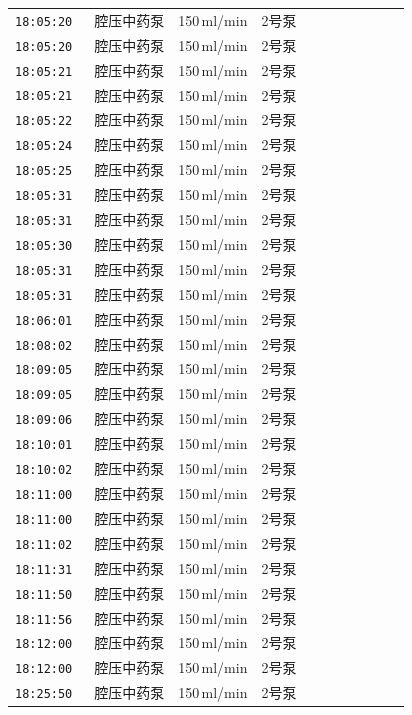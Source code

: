\documentclass[UTF8,10pt,a4paper,fontset=fandol]{ctexart}
\begin{document}
\begin{center}
\begin{tabular}{p{0.18\linewidth}p{0.72\linewidth}}
\texttt{18:05:20} & 腔压中药泵　150\,ml/min　2号泵\\
\texttt{18:05:20} & 腔压中药泵　150\,ml/min　2号泵\\
\texttt{18:05:21} & 腔压中药泵　150\,ml/min　2号泵\\
\texttt{18:05:21} & 腔压中药泵　150\,ml/min　2号泵\\
\texttt{18:05:22} & 腔压中药泵　150\,ml/min　2号泵\\
\texttt{18:05:24} & 腔压中药泵　150\,ml/min　2号泵\\
\texttt{18:05:25} & 腔压中药泵　150\,ml/min　2号泵\\
\texttt{18:05:31} & 腔压中药泵　150\,ml/min　2号泵\\
\texttt{18:05:31} & 腔压中药泵　150\,ml/min　2号泵\\
\texttt{18:05:30} & 腔压中药泵　150\,ml/min　2号泵\\
\texttt{18:05:31} & 腔压中药泵　150\,ml/min　2号泵\\
\texttt{18:05:31} & 腔压中药泵　150\,ml/min　2号泵\\
\texttt{18:06:01} & 腔压中药泵　150\,ml/min　2号泵\\
\texttt{18:08:02} & 腔压中药泵　150\,ml/min　2号泵\\
\texttt{18:09:05} & 腔压中药泵　150\,ml/min　2号泵\\
\texttt{18:09:05} & 腔压中药泵　150\,ml/min　2号泵\\
\texttt{18:09:06} & 腔压中药泵　150\,ml/min　2号泵\\
\texttt{18:10:01} & 腔压中药泵　150\,ml/min　2号泵\\
\texttt{18:10:02} & 腔压中药泵　150\,ml/min　2号泵\\
\texttt{18:11:00} & 腔压中药泵　150\,ml/min　2号泵\\
\texttt{18:11:00} & 腔压中药泵　150\,ml/min　2号泵\\
\texttt{18:11:02} & 腔压中药泵　150\,ml/min　2号泵\\
\texttt{18:11:31} & 腔压中药泵　150\,ml/min　2号泵\\
\texttt{18:11:50} & 腔压中药泵　150\,ml/min　2号泵\\
\texttt{18:11:56} & 腔压中药泵　150\,ml/min　2号泵\\
\texttt{18:12:00} & 腔压中药泵　150\,ml/min　2号泵\\
\texttt{18:12:00} & 腔压中药泵　150\,ml/min　2号泵\\
\texttt{18:25:50} & 腔压中药泵　150\,ml/min　2号泵\\
\end{tabular}
\end{center}
\end{document}
